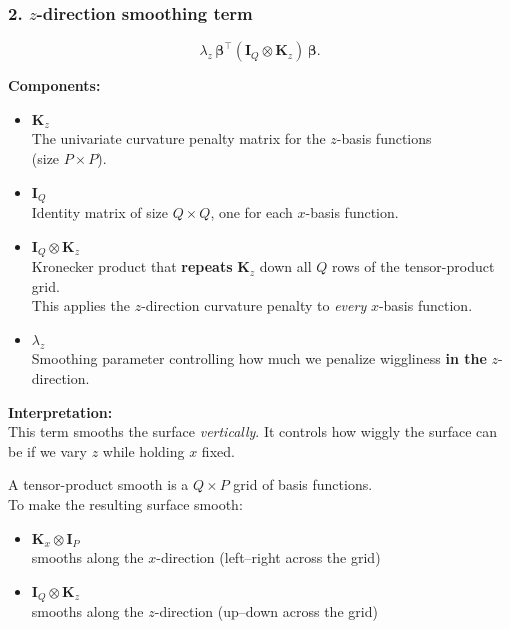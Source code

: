 \documentclass[
  letterpaper,
  DIV=11,
  numbers=noendperiod]{scrreprt}
\begin{document}
\hypertarget{z-direction-smoothing-term}{%
\subsubsection*{\texorpdfstring{\textbf{2.} \(z\)-direction smoothing
term}{2. z-direction smoothing term}}\label{z-direction-smoothing-term}}

\[
\lambda_z\, \boldsymbol{\beta}^\top (\mathbf{I}_{Q} \otimes \mathbf{K}_z)\, \boldsymbol{\beta}.
\]

\textbf{Components:}

\begin{itemize}
\item
  \(\mathbf{K}_z\)\\
  The univariate curvature penalty matrix for the \(z\)-basis
  functions\\
  (size \(P \times P\)).
\item
  \(\mathbf{I}_{Q}\)\\
  Identity matrix of size \(Q \times Q\), one for each \(x\)-basis
  function.
\item
  \(\mathbf{I}_Q \otimes \mathbf{K}_z\)\\
  Kronecker product that \textbf{repeats} \(\mathbf{K}_z\) down all
  \(Q\) rows of the tensor-product grid.\\
  This applies the \(z\)-direction curvature penalty to \emph{every}
  \(x\)-basis function.
\item
  \(\lambda_z\)\\
  Smoothing parameter controlling how much we penalize wiggliness
  \textbf{in the} \(z\)-direction.
\end{itemize}

\textbf{Interpretation:}\\
This term smooths the surface \emph{vertically}. It controls how wiggly
the surface can be if we vary \(z\) while holding \(x\) fixed.

A tensor-product smooth is a \(Q \times P\) grid of basis functions.\\
To make the resulting surface smooth:

\begin{itemize}
\item
  \(\mathbf{K}_x \otimes \mathbf{I}_P\)\\
  smooths along the \(x\)-direction (left--right across the grid)
\item
  \(\mathbf{I}_Q \otimes \mathbf{K}_z\)\\
  smooths along the \(z\)-direction (up--down across the grid)
\end{itemize}
\end{document}
